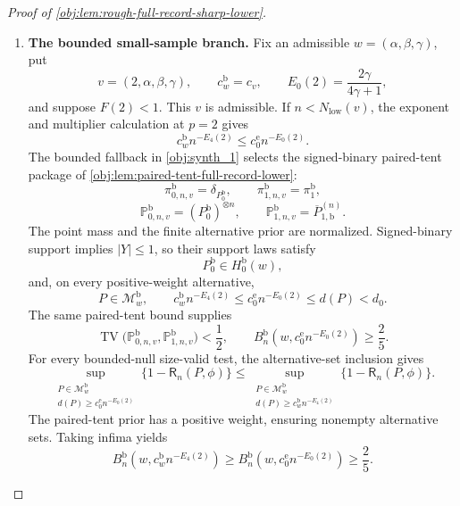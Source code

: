 \begin{proof}[Proof of \cref{obj:lem:rough-full-record-sharp-lower}]
\begin{enumerate}
\item \textbf{The bounded small-sample branch.}
Fix an admissible \(w=(\alpha,\beta,\gamma)\), put
\[
v=(2,\alpha,\beta,\gamma),
\qquad
c_w^{\mathrm b}=c_v,
\qquad
E_0(2)=\frac{2\gamma}{4\gamma+1},
\]
and suppose \(F(2)<1\). This \(v\) is admissible. If \(n<N_{\mathrm{low}}(v)\), the exponent and multiplier calculation at \(p=2\) gives
\[
c_w^{\mathrm b}n^{-E_4(2)}
\le c_0^{\mathrm e}n^{-E_0(2)}.
\]
The bounded fallback in \cref{obj:synth_1} selects the signed-binary paired-tent package of
\cref{obj:lem:paired-tent-full-record-lower}:
\[
\pi^{\mathrm b}_{0,n,v}=\delta_{P_0^{\mathrm b}},
\qquad
\pi^{\mathrm b}_{1,n,v}=\pi_1^{\mathrm b},
\]
\[
\mathbb P^{\mathrm b}_{0,n,v}
=(P_0^{\mathrm b})^{\otimes n},
\qquad
\mathbb P^{\mathrm b}_{1,n,v}
=\overline P_{1,\mathrm b}^{(n)}.
\]
The point mass and the finite alternative prior are normalized. Signed-binary support implies \(|Y|\le1\), so their support laws satisfy
\[
P_0^{\mathrm b}\in H_0^{\mathrm b}(w),
\]
and, on every positive-weight alternative,
\[
P\in\mathcal M_w^{\mathrm b},
\qquad
c_w^{\mathrm b}n^{-E_4(2)}
\le c_0^{\mathrm e}n^{-E_0(2)}
\le d(P)<d_0.
\]
The same paired-tent bound supplies
\[
\operatorname{TV}
\bigl(\mathbb P^{\mathrm b}_{0,n,v},
      \mathbb P^{\mathrm b}_{1,n,v}\bigr)<\frac12,
\qquad
B_n^{\mathrm b}\!\left(w,c_0^{\mathrm e}n^{-E_0(2)}\right)
\ge\frac25.
\]
For every bounded-null size-valid test, the alternative-set inclusion gives
\[
\sup_{\substack{P\in\mathcal M_w^{\mathrm b}\\
d(P)\ge c_0^{\mathrm e}n^{-E_0(2)}}}
\{1-\mathsf R_n(P,\phi)\}
\le
\sup_{\substack{P\in\mathcal M_w^{\mathrm b}\\
d(P)\ge c_w^{\mathrm b}n^{-E_4(2)}}}
\{1-\mathsf R_n(P,\phi)\}.
\]
The paired-tent prior has a positive weight, ensuring nonempty alternative sets. Taking infima yields
\[
B_n^{\mathrm b}\!\left(w,c_w^{\mathrm b}n^{-E_4(2)}\right)
\ge
B_n^{\mathrm b}\!\left(w,c_0^{\mathrm e}n^{-E_0(2)}\right)
\ge\frac25.
\]


\end{enumerate}
\end{proof}
